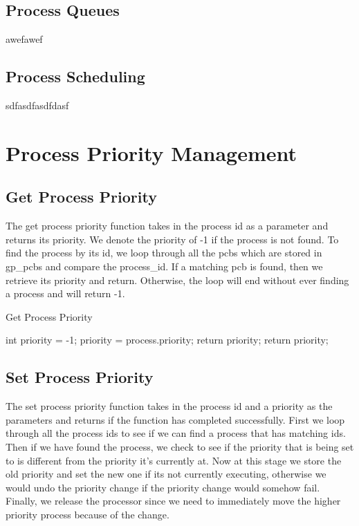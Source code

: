 \documentclass[12pt]{report}
\begin{document}
\subsection{Process Queues}
awefawef

\subsection{Process Scheduling}
sdfasdfasdfdasf


\section{Process Priority Management}

\subsection{Get Process Priority}

The get process priority function takes in the process id as a parameter and returns its priority. We denote the priority of -1 if the process is not found. To find the process by its id, we loop through all the pcbs which are stored in gp_pcbs and compare the process_id. If a matching pcb is found, then we retrieve its priority and return. Otherwise, the loop will end without ever finding a process and will return -1.

\begin{algorithm}[H]
  \caption{Get Process Priority}
  \begin{algorithmic}[1]
  \State int priority = -1;
      \State priority = process.priority;
      \State return priority;
     \EndIf
  \EndFor
  \State return priority;
  \EndFunction
  \end{algorithmic}
\end{algorithm}

\subsection{Set Process Priority}

The set process priority function takes in the process id and a priority as the parameters and returns if the function has completed successfully. First we loop through all the process ids to see if we can find a process that has matching ids. Then if we have found the process, we check to see if the priority that is being set to is different from the priority it's currently at. Now at this stage we store the old priority and set the new one if its not currently executing, otherwise we would undo the priority change if the priority change would somehow fail. Finally, we release the processor since we need to immediately move the higher priority process because of the change.
\end{document}
